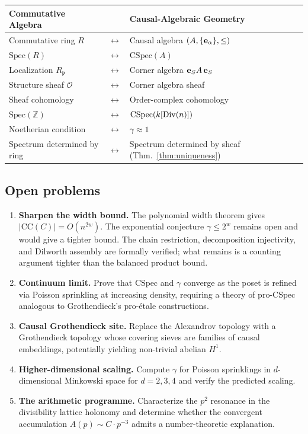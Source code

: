 \documentclass[11pt,a4paper]{article}
\theoremstyle{plain}
\theoremstyle{definition}
\theoremstyle{remark}
\newcommand{\CSpec}{\mathrm{CSpec}}
\newcommand{\CC}{\mathrm{CC}}
\newcommand{\Spec}{\mathrm{Spec}}
\newcommand{\Z}{\mathbb{Z}}
\begin{document}
\medskip
\begin{center}
\begin{tabular}{lcl}
\toprule
Commutative Algebra & & Causal-Algebraic Geometry \\
\midrule
Commutative ring $R$           & $\longleftrightarrow$ & Causal algebra $(A, \{{\bf e}_\alpha\}, \leq)$ \\
$\Spec(R)$                     & $\longleftrightarrow$ & $\CSpec(A)$ \\
Localization $R_{\mathfrak{p}}$& $\longleftrightarrow$ & Corner algebra ${\bf e}_S A\, {\bf e}_S$ \\
Structure sheaf $\mathcal{O}$  & $\longleftrightarrow$ & Corner algebra sheaf \\
Sheaf cohomology               & $\longleftrightarrow$ & Order-complex cohomology \\
$\Spec(\Z)$                    & $\longleftrightarrow$ & $\CSpec(k[{\rm Div}(n)])$ \\
Noetherian condition            & $\longleftrightarrow$ & $\gamma \approx 1$ \\
Spectrum determined by ring     & $\longleftrightarrow$ & Spectrum determined by sheaf (Thm.~\ref{thm:uniqueness}) \\
\bottomrule
\end{tabular}
\end{center}


\subsection{Open problems}

\begin{enumerate}
\item \textbf{Sharpen the width bound.}
The polynomial width theorem gives $|\CC(C)| = O(n^{2w})$.
The exponential conjecture $\gamma \leq 2^w$ remains open and would give a tighter bound.
The chain restriction, decomposition injectivity, and Dilworth assembly are formally verified; what remains is a counting argument tighter than the balanced product bound.

\item \textbf{Continuum limit.}
Prove that $\CSpec$ and $\gamma$ converge as the poset is refined via Poisson sprinkling at increasing density, requiring a theory of pro-$\CSpec$ analogous to Grothendieck's pro-\'etale constructions.

\item \textbf{Causal Grothendieck site.}
Replace the Alexandrov topology with a Grothendieck topology whose covering sieves are families of causal embeddings, potentially yielding non-trivial abelian $H^1$.

\item \textbf{Higher-dimensional scaling.}
Compute $\gamma$ for Poisson sprinklings in $d$-dimensional Minkowski space for $d = 2, 3, 4$ and verify the predicted scaling.

\item \textbf{The arithmetic programme.}
Characterize the $p^2$ resonance in the divisibility lattice holonomy and determine whether the convergent accumulation $A(p) \sim C \cdot p^{-3}$ admits a number-theoretic explanation.
\end{enumerate}
\end{document}
